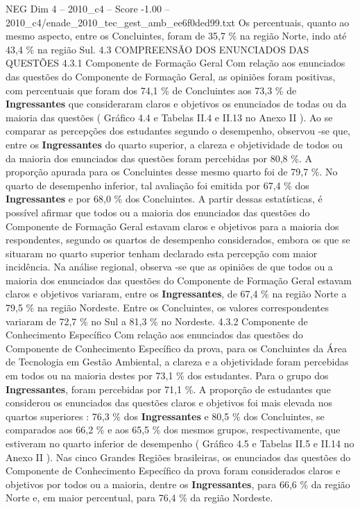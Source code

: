 \begin{textsample}{NEG Dim 4 – 2010\_c4 – Score -1.00 – 2010\_c4/enade\_2010\_tec\_gest\_amb\_ee6f0ded99.txt}
Os percentuais, quanto ao mesmo aspecto, entre os Concluintes, foram de 35,7 \% na região Norte, indo até 43,4 \% na região Sul. 4.3 COMPREENSÃO DOS ENUNCIADOS DAS QUESTÕES 4.3.1 Componente de Formação Geral Com relação aos enunciados das questões do Componente de Formação Geral, as opiniões foram positivas, com percentuais que foram dos 74,1 \% de Concluintes aos 73,3 \% de \textbf{Ingressantes} que consideraram claros e objetivos os enunciados de todas ou da maioria das questões ( Gráfico 4.4 e Tabelas II.4 e II.13 no Anexo II ).
Ao se comparar as percepções dos estudantes segundo o desempenho, observou -se que, entre os \textbf{Ingressantes} do quarto superior, a clareza e objetividade de todos ou da maioria dos enunciados das questões foram percebidas por 80,8 \%.
A proporção apurada para os Concluintes desse mesmo quarto foi de 79,7 \%.
No quarto de desempenho inferior, tal avaliação foi emitida por 67,4 \% dos \textbf{Ingressantes} e por 68,0 \% dos Concluintes.
A partir dessas estatísticas, é possível afirmar que todos ou a maioria dos enunciados das questões do Componente de Formação Geral estavam claros e objetivos para a maioria dos respondentes, segundo os quartos de desempenho considerados, embora os que se situaram no quarto superior tenham declarado esta percepção com maior incidência.
Na análise regional, observa -se que as opiniões de que todos ou a maioria dos enunciados das questões do Componente de Formação Geral estavam claros e objetivos variaram, entre os \textbf{Ingressantes}, de 67,4 \% na região Norte a 79,5 \% na região Nordeste.
Entre os Concluintes, os valores correspondentes variaram de 72,7 \% no Sul a 81,3 \% no Nordeste. 4.3.2 Componente de Conhecimento Específico Com relação aos enunciados das questões do Componente de Conhecimento Específico da prova, para os Concluintes da Área de Tecnologia em Gestão Ambiental, a clareza e a objetividade foram percebidas em todos ou na maioria destes por 73,1 \% dos estudantes.
Para o grupo dos \textbf{Ingressantes}, foram percebidas por 71,1 \%.
A proporção de estudantes que considerou os enunciados das questões claros e objetivos foi mais elevada nos quartos superiores : 76,3 \% dos \textbf{Ingressantes} e 80,5 \% dos Concluintes, se comparados aos 66,2 \% e aos 65,5 \% dos mesmos grupos, respectivamente, que estiveram no quarto inferior de desempenho ( Gráfico 4.5 e Tabelas II.5 e II.14 no Anexo II ).
Nas cinco Grandes Regiões brasileiras, os enunciados das questões do Componente de Conhecimento Específico da prova foram considerados claros e objetivos por todos ou a maioria, dentre os \textbf{Ingressantes}, para 66,6 \% da região Norte e, em maior percentual, para 76,4 \% da região Nordeste.

\end{textsample}
